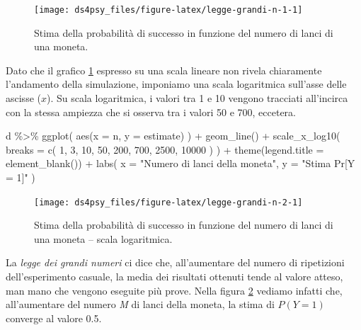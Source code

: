 \documentclass[
  11pt,
]{krantz}
\makeatletter
\newenvironment{Shaded}{\begin{snugshade}}{\end{snugshade}}
\newcommand{\AttributeTok}[1]{\textcolor[rgb]{0.61,0.61,0.61}{#1}}
\newcommand{\DecValTok}[1]{\textcolor[rgb]{0.06,0.06,0.06}{#1}}
\newcommand{\FunctionTok}[1]{\textcolor[rgb]{0,0,0}{#1}}
\newcommand{\NormalTok}[1]{#1}
\newcommand{\SpecialCharTok}[1]{\textcolor[rgb]{0,0,0}{#1}}
\newcommand{\StringTok}[1]{\textcolor[rgb]{0.5,0.5,0.5}{#1}}
\newenvironment{kframe}{%
\medskip{}
\setlength{\fboxsep}{.8em}
 \def\at@end@of@kframe{}%
 \ifinner\ifhmode%
  \def\at@end@of@kframe{\end{minipage}}%
  \begin{minipage}{\columnwidth}%
 \fi\fi%
 \def\FrameCommand##1{\hskip\@totalleftmargin \hskip-\fboxsep
 \colorbox{shadecolor}{##1}\hskip-\fboxsep
     \hskip-\linewidth \hskip-\@totalleftmargin \hskip\columnwidth}%
 \MakeFramed {\advance\hsize-\width
   \@totalleftmargin\z@ \linewidth\hsize
   \@setminipage}}%
 {\par\unskip\endMakeFramed%
 \at@end@of@kframe}
\renewenvironment{Shaded}{\begin{kframe}}{\end{kframe}}
\theoremstyle{definition}
\theoremstyle{definition}
\theoremstyle{definition}
\theoremstyle{definition}
\theoremstyle{remark}
\makeatother
\begin{document}
\begin{figure}

{\centering \texttt{[image: ds4psy\_files/figure-latex/legge-grandi-n-1-1]} 

}

\caption{Stima della probabilità di successo in funzione del numero di lanci di una moneta.}\label{fig:legge-grandi-n-1}
\end{figure}

Dato che il grafico \ref{fig:legge-grandi-n-1} espresso su una scala lineare non rivela chiaramente l'andamento della simulazione, imponiamo una scala logaritmica sull'asse delle ascisse (\(x\)). Su scala logaritmica, i valori tra 1 e 10 vengono tracciati all'incirca con la stessa ampiezza che si osserva tra i valori 50 e 700, eccetera.

\begin{Shaded}
\begin{Highlighting}[]
\NormalTok{d }\SpecialCharTok{\%\textgreater{}\%}
  \FunctionTok{ggplot}\NormalTok{(}
    \FunctionTok{aes}\NormalTok{(}\AttributeTok{x =}\NormalTok{ n, }\AttributeTok{y =}\NormalTok{ estimate)}
\NormalTok{  ) }\SpecialCharTok{+}
  \FunctionTok{geom\_line}\NormalTok{() }\SpecialCharTok{+}
  \FunctionTok{scale\_x\_log10}\NormalTok{(}
    \AttributeTok{breaks =} \FunctionTok{c}\NormalTok{(}
      \DecValTok{1}\NormalTok{, }\DecValTok{3}\NormalTok{, }\DecValTok{10}\NormalTok{, }\DecValTok{50}\NormalTok{, }\DecValTok{200}\NormalTok{,}
      \DecValTok{700}\NormalTok{, }\DecValTok{2500}\NormalTok{, }\DecValTok{10000}
\NormalTok{    )}
\NormalTok{  ) }\SpecialCharTok{+}
  \FunctionTok{theme}\NormalTok{(}\AttributeTok{legend.title =} \FunctionTok{element\_blank}\NormalTok{()) }\SpecialCharTok{+}
  \FunctionTok{labs}\NormalTok{(}
    \AttributeTok{x =} \StringTok{"Numero di lanci della moneta"}\NormalTok{,}
    \AttributeTok{y =} \StringTok{"Stima Pr[Y = 1]"}
\NormalTok{  )}
\end{Highlighting}
\end{Shaded}

\begin{figure}

{\centering \texttt{[image: ds4psy\_files/figure-latex/legge-grandi-n-2-1]} 

}

\caption{Stima della probabilità di successo in funzione del numero di lanci di una moneta -- scala logaritmica.}\label{fig:legge-grandi-n-2}
\end{figure}

La \emph{legge dei grandi numeri} ci dice che, all'aumentare del numero di ripetizioni dell'esperimento casuale, la media dei risultati ottenuti tende al valore atteso, man mano che vengono eseguite più prove. Nella figura \ref{fig:legge-grandi-n-2} vediamo infatti che, all'aumentare del numero \emph{M} di lanci della moneta, la stima di \(P(Y = 1)\) converge al valore 0.5.
\end{document}
